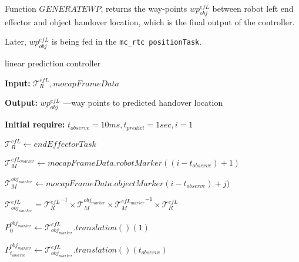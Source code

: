 Function $GENERATEWP$, returns the way-points $wp^{efL}_{obj}$ between robot left end effector and object handover location, which is the final output of the controller. 

Later, $wp^{efL}_{obj}$ is being fed in the \texttt{mc\_rtc positionTask}.

\newpage

\begin{algorithm}[H]
	\caption{linear prediction controller}
	
	\begin{algorithmic}[1]
		
		\Statex\textbf{Input:} $\mathcal{T}^{efL}_R, mocapFrameData$
		
		\Statex\textbf{Output:}  $wp^{efL}_{obj}$ ---{way points to predicted handover location} %
		
		\Statex\textbf{Initial require:} $t_{observe}=10ms, t_{predict}=1sec, i=1 $\newline
		
		
		
		\newline
		
		\State $\mathcal{T}^{efL}_R\gets \textit{endEffectorTask}$
		
		\State $\mathcal{T}^{efL_{marker}}_M\gets \textit{mocapFrameData}.robotMarker((i-t_{observe})+1)$\newline
		
		
		
		\State $\mathcal{T}^{obj_{marker}}_M\gets \textit{mocapFrameData}.objectMarker(i-t_{observe})+j)$	
		
		\State $\mathcal{T}^{efL}_{obj_{marker}} = {\mathcal{T}^{efL}_R}^{-1} \times  \mathcal{T}^{obj_{marker}}_M \times {\mathcal{T}^{efL_{marker}}_M}^{-1} \times  \mathcal{T}^{efL}_R$	
		
		
		\State $P^{obj_{marker}}_0 \gets \mathcal{T}^{efL}_{obj_{marker}}.translation()(1) $
		\EndIf 
		
		\State $P^{obj_{marker}}_{t_{observe}} \gets \mathcal{T}^{efL}_{obj_{marker}}.translation()(t_{observe}) $
		\EndIf
		
		
		\EndFor  \newline %
		

\end{algorithmic}
\end{algorithm}
